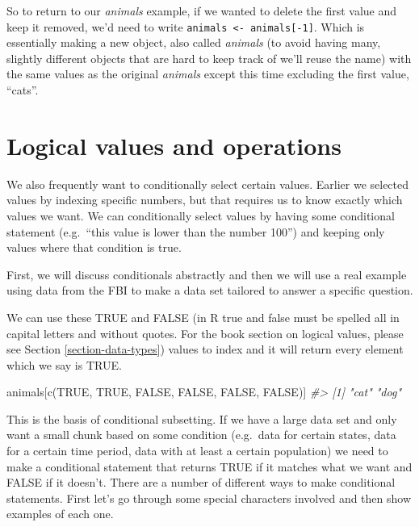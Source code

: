 \documentclass[
]{krantz}
\makeatletter
\newenvironment{Shaded}{\begin{snugshade}}{\end{snugshade}}
\newcommand{\CommentTok}[1]{\textcolor[rgb]{0.37,0.37,0.37}{\textit{#1}}}
\newcommand{\ConstantTok}[1]{\textcolor[rgb]{0,0,0}{#1}}
\newcommand{\FunctionTok}[1]{\textcolor[rgb]{0,0,0}{#1}}
\newcommand{\NormalTok}[1]{#1}
\newenvironment{kframe}{%
\medskip{}
\setlength{\fboxsep}{.8em}
 \def\at@end@of@kframe{}%
 \ifinner\ifhmode%
  \def\at@end@of@kframe{\end{minipage}}%
  \begin{minipage}{\columnwidth}%
 \fi\fi%
 \def\FrameCommand##1{\hskip\@totalleftmargin \hskip-\fboxsep
 \colorbox{shadecolor}{##1}\hskip-\fboxsep
     \hskip-\linewidth \hskip-\@totalleftmargin \hskip\columnwidth}%
 \MakeFramed {\advance\hsize-\width
   \@totalleftmargin\z@ \linewidth\hsize
   \@setminipage}}%
 {\par\unskip\endMakeFramed%
 \at@end@of@kframe}
\renewenvironment{Shaded}{\begin{kframe}}{\end{kframe}}
\makeatother
\begin{document}
So to return to our \emph{animals} example, if we wanted to
delete the first value and keep it removed, we'd need to
write \texttt{animals\ \textless{}-\ animals{[}-1{]}}. Which
is essentially making a new object, also called
\emph{animals} (to avoid having many, slightly different
objects that are hard to keep track of we'll reuse the name)
with the same values as the original \emph{animals} except
this time excluding the first value, ``cats''.

\hypertarget{logical-values-and-operations}{%
\section{Logical values and
operations}\label{logical-values-and-operations}}

We also frequently want to conditionally select certain
values. Earlier we selected values by indexing specific
numbers, but that requires us to know exactly which values
we want. We can conditionally select values by having some
conditional statement (e.g.~``this value is lower than the
number 100'') and keeping only values where that condition
is true.

First, we will discuss conditionals abstractly and then we
will use a real example using data from the FBI to make a
data set tailored to answer a specific question.

We can use these TRUE and FALSE (in R true and false must be
spelled all in capital letters and without quotes. For the
book section on logical values, please see Section
\ref{section-data-types}) values to index and it will return
every element which we say is TRUE.

\begin{Shaded}
\begin{Highlighting}[]
\NormalTok{animals[}\FunctionTok{c}\NormalTok{(}\ConstantTok{TRUE}\NormalTok{, }\ConstantTok{TRUE}\NormalTok{, }\ConstantTok{FALSE}\NormalTok{, }\ConstantTok{FALSE}\NormalTok{, }\ConstantTok{FALSE}\NormalTok{, }\ConstantTok{FALSE}\NormalTok{)]}
\CommentTok{\#\textgreater{} [1] "cat" "dog"}
\end{Highlighting}
\end{Shaded}

This is the basis of conditional subsetting. If we have a
large data set and only want a small chunk based on some
condition (e.g.~data for certain states, data for a certain
time period, data with at least a certain population) we
need to make a conditional statement that returns TRUE if it
matches what we want and FALSE if it doesn't. There are a
number of different ways to make conditional statements.
First let's go through some special characters involved and
then show examples of each one.
\end{document}
